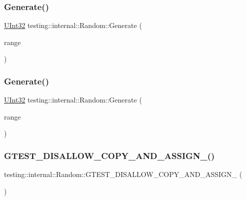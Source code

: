 \subsubsection{\texorpdfstring{Generate()}{Generate()}\hspace{0.1cm}{\footnotesize\ttfamily [2/3]}}
{\footnotesize\ttfamily \mbox{\hyperlink{namespacetesting_1_1internal_a436defbb8e92c8e94e33ebcc86f278ba}{U\+Int32}} testing\+::internal\+::\+Random\+::\+Generate (\begin{DoxyParamCaption}\item[{\mbox{\hyperlink{namespacetesting_1_1internal_a436defbb8e92c8e94e33ebcc86f278ba}{U\+Int32}}}]{range }\end{DoxyParamCaption})}

\mbox{\label{classtesting_1_1internal_1_1_random_a9315b7fb621cbcfdf92ed4b5e584c0db}} 
\subsubsection{\texorpdfstring{Generate()}{Generate()}\hspace{0.1cm}{\footnotesize\ttfamily [3/3]}}
{\footnotesize\ttfamily \mbox{\hyperlink{namespacetesting_1_1internal_a436defbb8e92c8e94e33ebcc86f278ba}{U\+Int32}} testing\+::internal\+::\+Random\+::\+Generate (\begin{DoxyParamCaption}\item[{\mbox{\hyperlink{namespacetesting_1_1internal_a436defbb8e92c8e94e33ebcc86f278ba}{U\+Int32}}}]{range }\end{DoxyParamCaption})}

\mbox{\label{classtesting_1_1internal_1_1_random_aa2f476d8cfe29f928b90d7339c849734}} 
\subsubsection{\texorpdfstring{GTEST\_DISALLOW\_COPY\_AND\_ASSIGN\_()}{GTEST\_DISALLOW\_COPY\_AND\_ASSIGN\_()}\hspace{0.1cm}{\footnotesize\ttfamily [1/3]}}
{\footnotesize\ttfamily testing\+::internal\+::\+Random\+::\+G\+T\+E\+S\+T\+\_\+\+D\+I\+S\+A\+L\+L\+O\+W\+\_\+\+C\+O\+P\+Y\+\_\+\+A\+N\+D\+\_\+\+A\+S\+S\+I\+G\+N\+\_\+ (\begin{DoxyParamCaption}\item[{\mbox{\hyperlink{classtesting_1_1internal_1_1_random}{Random}}}]{ }\end{DoxyParamCaption})\hspace{0.3cm}{\ttfamily [private]}}

